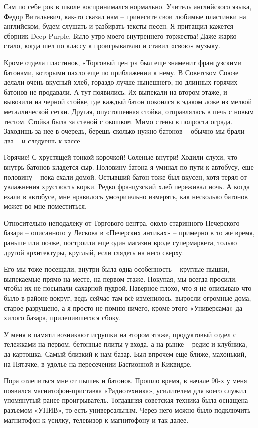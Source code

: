 Сам по себе рок в школе воспринимался нормально. Учитель английского языка, Федор Витальевич, как-то сказал нам – принесите свои любимые пластинки на английском, будем слушать и разбирать тексты песен. Я притащил кажется сборник Deep Purple. Было утро моего внутреннего торжества! Даже жарко стало, когда шел по классу к проигрывателю и ставил «свою» музыку.

Кроме отдела пластинок, «Торговый центр» был еще знаменит французскими батонами, которыми пахло еще по приближении к нему. В Советском Союзе делали очень вкусный хлеб, гораздо лучше нынешнего, но длинных горячих батонов не продавали. А тут появились. Их выпекали на втором этаже, и вывозили на черной стойке, где каждый батон покоился в эдаком ложе из мелкой металлической сетки. Другая, опустошенная стойка, отправлялась в печь с новым тестом. Стойка была за стеной с окошком. Мимо стены в полроста ограда. Заходишь за нее в очередь, берешь сколько нужно батонов – обычно мы брали два – и следуешь к кассе.

Горячие! С хрустящей тонкой корочкой! Соленые внутри! Ходили слухи, что внутрь батонов кладется сыр. Половину батона я уминал по пути к автобусу, еще половину – пока ехали домой. Остывший батон тоже был вкусен, хотя терял от увлажнения хрусткость корки. Редко французский хлеб переживал ночь. А когда ехали в автобусе, мне нравилось умозрительно измерять, как несколько батонов может во мне поместиться.

Относительно неподалеку от Торгового центра, около старинного Печерского базара – описанного у Лескова в «Печерских антиках» – примерно в то же время, раньше или позже, построили еще один магазин вроде супермаркета, только другой архитектуры, круглый, если глядеть на него сверху. 

Его мы тоже посещали, внутри была одна особенность – круглые пышки, выпекаемые прямо на месте, на первом этаже. Покупая, мы всегда просили, чтобы их не посыпали сахарной пудрой. Наверное плохо, что я не описываю что было в районе вокруг, ведь сейчас там всё изменилось, выросли огромные дома, старое разрушено, а я просто не помню ничего, кроме этого «Универсама» да хилого базара, прилепившегося сбоку. 

У меня в памяти возникают игрушки на втором этаже, продуктовый отдел с тележками на первом, бетонные плиты у входа, а на рынке – редис и клубника, да картошка. Самый близкий к нам базар. Был впрочем еще ближе, махонький, на Пятачке, в удолье на пересечении Бастионной и Киквидзе. 

Пора отлепиться мне от пышек и батонов. Прошло время, в начале 90-х у меня появился магнитофон-приста\-вка «Радиотехника», усилителем для коего служил упомянутый ранее проигрыватель. Тогдашняя советская техника была оснащена разъемом «УНИВ», то есть универсальным. Через него можно было подключить магнитофон к усилку, телевизор к магнитофону и так далее.

